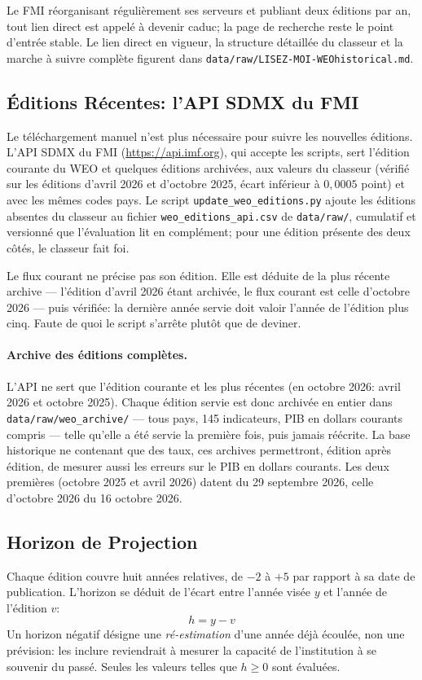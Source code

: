 \documentclass[11pt,a4paper]{article}
\begin{document}
Le FMI réorganisant régulièrement ses serveurs et publiant deux éditions par an, tout lien direct est appelé à devenir caduc; la page de recherche reste le point d'entrée stable. Le lien direct en vigueur, la structure détaillée du classeur et la marche à suivre complète figurent dans \texttt{data/raw/LISEZ-MOI-WEOhistorical.md}.

\subsection{Éditions Récentes: l'API SDMX du FMI}
Le téléchargement manuel n'est plus nécessaire pour suivre les nouvelles éditions. L'API SDMX du FMI (\url{https://api.imf.org}), qui accepte les scripts, sert l'édition courante du WEO et quelques éditions archivées, aux valeurs du classeur (vérifié sur les éditions d'avril 2026 et d'octobre 2025, écart inférieur à $0{,}0005$ point) et avec les mêmes codes pays. Le script \texttt{update\_weo\_editions.py} ajoute les éditions absentes du classeur au fichier \texttt{weo\_editions\_api.csv} de \texttt{data/raw/}, cumulatif et versionné que l'évaluation lit en complément; pour une édition présente des deux côtés, le classeur fait foi.

Le flux courant ne précise pas son édition. Elle est déduite de la plus récente archive --- l'édition d'avril 2026 étant archivée, le flux courant est celle d'octobre 2026 --- puis vérifiée: la dernière année servie doit valoir l'année de l'édition plus cinq. Faute de quoi le script s'arrête plutôt que de deviner.

\paragraph{Archive des éditions complètes.} L'API ne sert que l'édition courante et les plus récentes (en octobre 2026: avril 2026 et octobre 2025). Chaque édition servie est donc archivée en entier dans \texttt{data/raw/weo\_archive/} --- tous pays, 145 indicateurs, PIB en dollars courants compris --- telle qu'elle a été servie la première fois, puis jamais réécrite. La base historique ne contenant que des taux, ces archives permettront, édition après édition, de mesurer aussi les erreurs sur le PIB en dollars courants. Les deux premières (octobre 2025 et avril 2026) datent du 29 septembre 2026, celle d'octobre 2026 du 16 octobre 2026.

\subsection{Horizon de Projection}
Chaque édition couvre huit années relatives, de $-2$ à $+5$ par rapport à sa date de publication. L'horizon se déduit de l'écart entre l'année visée $y$ et l'année de l'édition $v$:
\begin{equation}
h = y - v
\end{equation}
Un horizon négatif désigne une \emph{ré-estimation} d'une année déjà écoulée, non une prévision: les inclure reviendrait à mesurer la capacité de l'institution à se souvenir du passé. Seules les valeurs telles que $h \geq 0$ sont évaluées.
\end{document}
